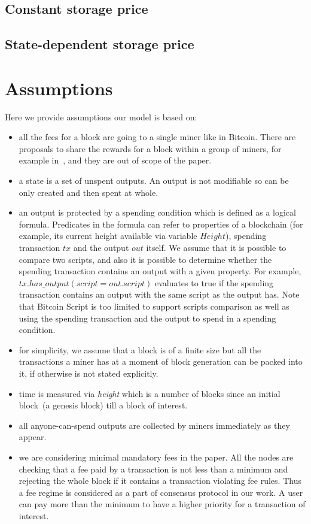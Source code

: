 \documentclass[]{llncs}   %
\newcommand{\authnote}[2]{\marginpar{\parbox{\marginparwidth}{\tiny %
  \textsf{#1 {\textcolor{blue}{notes: #2}}}}}%
  \textcolor{blue}{\textbf{\dag}}}
\newcommand{\authnote}[2]{
  \textsf{#1\textcolor{blue}{ #2}}}
\newcommand{\authnote}[2]{}
\newcommand{\knote}[1]{{\authnote{\textcolor{green}{Alex notes:}}{#1}}}
\begin{document}
\subsection{Constant storage price}
\subsection{State-dependent storage price}


\knote{to remove totally?}

\section{Assumptions}
Here we provide assumptions our model is based on:

\begin{itemize}
  \item{} all the fees for a block are going to a single miner like in Bitcoin.
      There are proposals to share the rewards for a block within a group of
      miners, for example in~\cite{eyal2016bitcoin,kogias2016enhancing}, and
      they are out of scope of the paper.
  \item{} a state is a set of unspent outputs. An output is not modifiable so
      can be only created and then spent at whole. 
  \item{} an output is protected by a spending condition which is defined as a
      logical formula. Predicates in the formula can refer to properties of a
      blockchain (for example, its current height available via variable
      $Height$), spending transaction $tx$ and the output $out$ itself. We
      assume that it is possible to compare two scripts, and also it is possible
      to determine whether the spending transaction contains an output with a
      given property. For example, $tx.has\_output(script = out.script)$
      evaluates to true if the spending transaction contains an output with the
      same script as the output has. Note that Bitcoin Script is too limited to
      support scripts comparison as well as using the spending transaction and
      the output to spend in a spending condition.
  \item{} for simplicity, we assume that a block is of a finite size but all the
      transactions a miner has at a moment of block generation can be packed
      into it, if otherwise is not stated explicitly.
  \item{} time is measured via \textit{height} which is a number of blocks since
      an initial block~(a genesis block) till a block of interest. 
  \item{} all anyone-can-spend outputs are collected by miners immediately as
      they appear.
  \item{} we are considering minimal mandatory fees in the paper. All the nodes
      are checking that a fee paid by a transaction is not less than a minimum
      and rejecting the whole block if it contains a transaction violating fee
      rules. Thus a fee regime is considered as a part of consensus protocol in
      our work. A user can pay more than the minimum to have a higher priority
      for a transaction of interest.   
\end{itemize}
\end{document}
